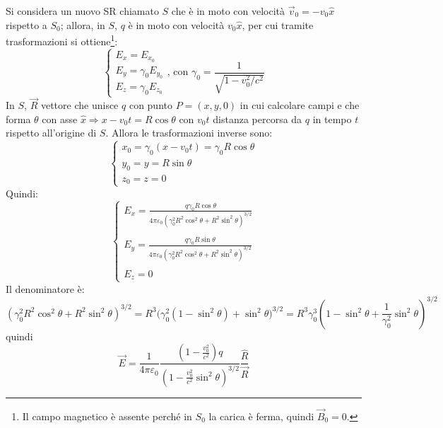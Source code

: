 \documentclass[10pt, a4paper]{scrartcl}
\numberwithin{equation}{subsection}
\theoremstyle{style1}
\begin{document}
Si considera un nuovo SR chiamato $S$ che \`e in moto con velocit\`a $\vec{v}_0 =  - v_0\hat{x}$ rispetto a $S_0$; allora, in $S$, $q $ \`e in moto con velocit\`a $v_0\hat{x}$, per cui tramite trasformazioni si ottiene\footnote{Il campo magnetico \`e assente perch\'e in $S_0$ la carica \`e ferma, quindi $\vec{B}_0 = 0$.}:
\begin{equation}
	\begin{cases}
		E_x = E_{x_0} \\
		E_y = \gamma_0 E_{y_0} \\
		E_{z} = \gamma_0 E_{z_0} 
	\end{cases} \text{, con } \gamma_0 = \frac{1}{\sqrt{1- v_0^2 / c^2} }
\end{equation}
In $S$, $\vec{R}$ vettore che unisce $q$ con punto $P=(x,y,0)$ in cui calcolare campi e che forma $\theta $ con asse $\hat{x} \Rightarrow x-v_0 t = R\cos \theta $ con $v_0 t$ distanza percorsa da $q$ in tempo $t$ rispetto all'origine di $S$. Allora le trasformazioni inverse sono:
\begin{equation}
	\begin{cases}
	x_0 = \gamma_0 (x-v_0t) = \gamma_0 R\cos\theta \\
	y_0 = y = R \sin \theta \\
	z_0 = z = 0
	\end{cases}
\end{equation}
Quindi:
\begin{equation}
	\begin{cases}
		\displaystyle E_x = \frac{q \gamma_0 R\cos \theta }{4\pi \varepsilon _0 (\gamma_0^2 R^2 \cos^2 \theta  + R^2 \sin^2 \theta )^{3 / 2} }\\
		\\
		\displaystyle E_y = \frac{q \gamma_0 R\sin \theta }{4\pi \varepsilon _0 (\gamma_0^2 R^2 \cos^2 \theta  + R^2 \sin^2 \theta )^{3 / 2} }\\
		\\
		\displaystyle E_z = 0
	\end{cases}
\end{equation}
Il denominatore \`e:
\[
(\gamma_0^2 R^2 \cos^2 \theta  + R^2 \sin^2 \theta )^{3 / 2}= R^3 \big(\gamma_0^2 (1- \sin^2 \theta ) + \sin^2 \theta \big)^{3 / 2} = R^3 \gamma_0^3 \left(1- \sin^2 \theta + \frac{1}{\gamma_0^2} \sin^2 \theta \right)^{3 / 2}   
\] 
quindi
\begin{equation}
	\vec{E} = \frac{1}{4\pi \varepsilon _0} \frac{\left(1 - \frac{v_0^2}{c^2}\right) q}{\left(1- \frac{v_0^2}{c^2}\sin^2 \theta \right) ^{3 / 2} } \frac{\hat{R}}{\vec{R}}
\end{equation}
\end{document}
